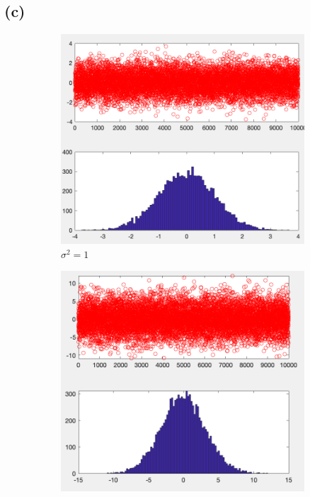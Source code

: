 \documentclass{article}
\begin{document}
\subsection{(c)}
\begin{figure}[H]
    \begin{subfigure}[h]{0.33\linewidth}
        \includegraphics[width=\linewidth]{imgs/q1c_1.png}
        \caption{\( \sigma^2 =1 \)}
    \end{subfigure}
    \begin{subfigure}[h]{0.33\linewidth}
        \includegraphics[width=\linewidth]{imgs/q1c_10.png}

\end{subfigure}
\end{figure}
\end{document}
